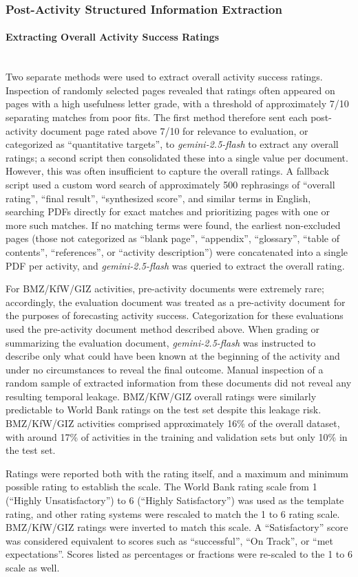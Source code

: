 \documentclass[12pt,a4paper]{article}
\newcommand{\subsubsubsection}[1]{\paragraph{#1}\mbox{}\\}
\begin{document}
\subsubsection{Post-Activity Structured Information Extraction}
\subsubsubsection{Extracting Overall Activity Success Ratings}
Two separate methods were used to extract overall activity success ratings. Inspection of randomly selected pages revealed that ratings often appeared on pages with a high usefulness letter grade, with a threshold of approximately 7/10 separating matches from poor fits. The first method therefore sent each post-activity document page rated above 7/10 for relevance to evaluation, or categorized as ``quantitative targets'', to \emph{gemini-2.5-flash} to extract any overall ratings; a second script then consolidated these into a single value per document. However, this was often insufficient to capture the overall ratings. A fallback script used a custom word search of approximately 500 rephrasings of ``overall rating'', ``final result'', ``synthesized score'', and similar terms in English, searching PDFs directly for exact matches and prioritizing pages with one or more such matches. If no matching terms were found, the earliest non-excluded pages (those not categorized as ``blank page'', ``appendix'', ``glossary'', ``table of contents'', ``references'', or ``activity description'') were concatenated into a single PDF per activity, and \emph{gemini-2.5-flash} was queried to extract the overall rating.

For BMZ/KfW/GIZ activities, pre-activity documents were extremely rare; accordingly, the evaluation document was treated as a pre-activity document for the purposes of forecasting activity success. Categorization for these evaluations used the pre-activity document method described above. When grading or summarizing the evaluation document, \emph{gemini-2.5-flash} was instructed to describe only what could have been known at the beginning of the activity and under no circumstances to reveal the final outcome. Manual inspection of a random sample of extracted information from these documents did not reveal any resulting temporal leakage.  BMZ/KfW/GIZ overall ratings were similarly predictable to World Bank ratings on the test set despite this leakage risk. BMZ/KfW/GIZ activities comprised approximately 16\% of the overall dataset, with around 17\% of activities in the training and validation sets but only 10\% in the test set.

Ratings were reported both with the rating itself, and a maximum and minimum possible rating to establish the scale. The World Bank rating scale from 1 (``Highly Unsatisfactory'') to 6 (``Highly Satisfactory'') was used as the template rating, and other rating systems were rescaled to match the 1 to 6 rating scale. BMZ/KfW/GIZ ratings were inverted to match this scale. A ``Satisfactory'' score was considered equivalent to scores such as ``successful'', ``On Track'', or ``met expectations''. Scores listed as percentages or fractions were re-scaled to the 1 to 6 scale as well. 
\end{document}
